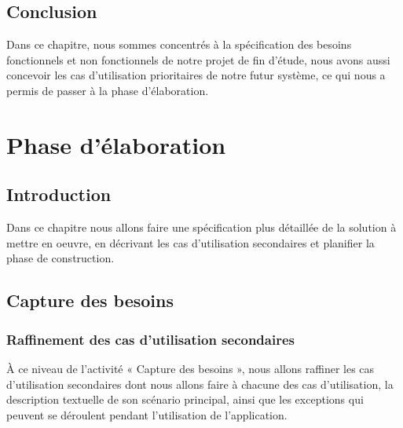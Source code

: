 \documentclass[12 pt]{report}
\begin{document}
\section*{Conclusion}  
Dans ce chapitre, nous sommes concentrés à la spécification des besoins fonctionnels et non fonctionnels de notre projet de fin d’étude, nous avons aussi concevoir les cas d’utilisation prioritaires de notre futur système, ce qui nous a permis de passer à la phase d’élaboration.

\chapter{Phase d’élaboration }
\section*{Introduction}  
Dans ce chapitre nous allons faire une spécification plus
détaillée de la solution à mettre en oeuvre, en décrivant les cas d'utilisation secondaires et planifier la phase de construction.
\section{Capture des besoins}
\subsection{Raffinement des cas d’utilisation secondaires}
À ce niveau de l’activité « Capture des besoins », nous allons raffiner les cas d'utilisation secondaires dont nous allons faire à chacune des cas d'utilisation, la description textuelle de son scénario principal, ainsi que les exceptions qui peuvent se déroulent pendant l'utilisation de l’application.
\newpage
\end{document}
